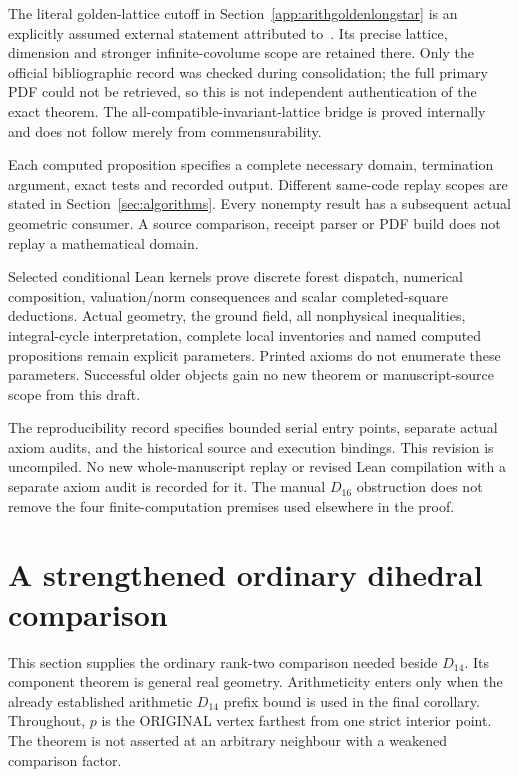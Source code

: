 \documentclass[11pt]{article}
\begin{document}
The literal golden-lattice cutoff in
Section~\ref{app:arithgoldenlongstar} is an explicitly assumed external
statement attributed to~\cite{BugaenkoGolden1984}. Its precise lattice,
dimension and stronger infinite-covolume scope are retained there.
Only the official bibliographic record was checked during consolidation;
the full primary PDF could not be retrieved, so this is not independent
authentication of the exact theorem. The all-compatible-invariant-lattice
bridge is proved internally and does not follow merely from commensurability.

Each computed proposition specifies a complete necessary domain,
termination argument, exact tests and recorded output. Different
same-code replay scopes are stated in Section~\ref{sec:algorithms}.
Every nonempty result has a subsequent actual geometric consumer.
A source comparison, receipt parser or PDF build does not replay a
mathematical domain.

Selected conditional Lean kernels prove discrete forest dispatch,
numerical composition, valuation/norm consequences and scalar
completed-square deductions. Actual geometry, the ground field,
all nonphysical inequalities, integral-cycle interpretation,
complete local inventories and named computed propositions remain
explicit parameters. Printed axioms do not enumerate these parameters.
Successful older objects gain no new theorem or manuscript-source
scope from this draft.

The reproducibility record specifies bounded serial entry points,
separate actual axiom audits, and the historical source and execution
bindings. This revision is uncompiled. No new whole-manuscript replay
or revised Lean compilation with a separate axiom audit is recorded
for it. The manual $D_{16}$ obstruction does not remove the four
finite-computation premises used elsewhere in the proof.

\appendix
\section{A strengthened ordinary dihedral comparison}
\label{app:arithdihedral}

This section supplies the ordinary rank-two comparison needed beside
\(D_{14}\).  Its component theorem is general real geometry.
Arithmeticity enters only when the already established arithmetic
\(D_{14}\) prefix bound is used in the final corollary.
Throughout, \(p\) is the ORIGINAL vertex farthest from one strict
interior point.  The theorem is not asserted at an arbitrary
neighbour with a weakened comparison factor.
\end{document}
